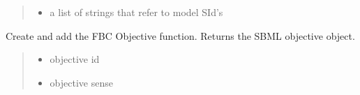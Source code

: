 \documentclass[letterpaper,12pt,english]{sphinxmanual}
\begin{document}
\begin{fulllineitems}
\begin{fulllineitems}
\begin{quote}
\begin{description}
\begin{itemize}
\item {} 
\sphinxAtStartPar
{} \textendash{} a list of strings that refer to model SId’s

\end{itemize}

\end{description}\end{quote}

\end{fulllineitems}


\begin{fulllineitems}
\label{\detokenize{api/io:cbmpy.CBXML.FBCconnect.createFluxBoundV1}}
\pysigstartsignatures
\pysiglinewithargsret
{}
{\sphinxparamcomma {}\sphinxparamcomma {}\sphinxparamcomma {}}
{}
\pysigstopsignatures
\end{fulllineitems}


\begin{fulllineitems}
\label{\detokenize{api/io:cbmpy.CBXML.FBCconnect.createObjective}}
\pysigstartsignatures
\pysiglinewithargsret
{}
{\sphinxparamcomma {}\sphinxparamcomma {}\sphinxparamcomma {}\sphinxparamcomma {}}
{}
\pysigstopsignatures
\sphinxAtStartPar
Create and add the FBC Objective function. Returns the SBML objective object.
\begin{quote}\begin{description}
\begin{itemize}
\item {} 
\sphinxAtStartPar
{} \textendash{} objective id

\item {} 
\sphinxAtStartPar
{} \textendash{} objective sense


\end{itemize}
\end{description}
\end{quote}
\end{fulllineitems}
\end{fulllineitems}
\end{document}
